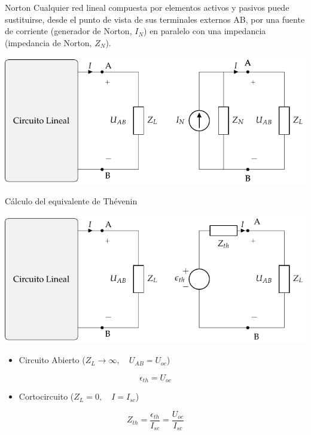 \documentclass[xcolor={usenames,svgnames,dvipsnames}]{beamer}
\begin{document}
\begin{frame}[label={sec:org1cd69bb}]{Norton}
Cualquier \alert{red lineal} compuesta por elementos activos y pasivos puede sustituirse, desde el punto de vista de sus terminales externos AB, por una \alert{fuente de corriente} (generador de Norton, \(I_N\)) en \alert{paralelo} con una impedancia (impedancia de Norton, \(Z_N\)).

\begin{center}
\includegraphics[width=.9\linewidth]{figs/EquivalenteNorton.pdf}
\end{center}
\end{frame}

\begin{frame}[label={sec:org477dcd8}]{Cálculo del equivalente de Thévenin}
\begin{center}
\includegraphics[width=.9\linewidth]{figs/EquivalenteThevenin.pdf}
\end{center}

\begin{itemize}
\item Circuito Abierto (\(Z_L \to \infty, \quad U_{AB} = U_{oc}\))
\end{itemize}
\[
\boxed{\epsilon_{th} = U_{oc}}
\]
\begin{itemize}
\item Cortocircuito (\(Z_L = 0, \quad I = I_{sc}\))
\end{itemize}
\[
\boxed{Z_{th} = \frac{\epsilon_{th}}{I_{sc}} = \frac{U_{oc}}{I_{sc}}}
\]
\end{frame}
\end{document}
